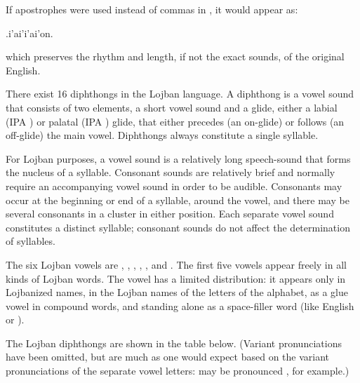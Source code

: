 If apostrophes were used instead of commas in , it would appear as:
\begin{example}
.i'ai'i'ai'on.\n
{}
\end{example}

{\noindent}which preserves the rhythm and length, if not the exact sounds, of the original English.



There exist 16 diphthongs in the Lojban language. A diphthong is a vowel sound that consists of two elements, a short vowel sound and a glide, either a labial (IPA ) or palatal (IPA ) glide, that either precedes (an on-glide) or follows (an off-glide) the main vowel. Diphthongs always constitute a single syllable.

For Lojban purposes, a vowel sound is a relatively long speech-sound that forms the nucleus of a syllable. Consonant sounds are relatively brief and normally require an accompanying vowel sound in order to be audible. Consonants may occur at the beginning or end of a syllable, around the vowel, and there may be several consonants in a cluster in either position. Each separate vowel sound constitutes a distinct syllable; consonant sounds do not affect the determination of syllables.

The six Lojban vowels are , , , , , and . The first five vowels appear freely in all kinds of Lojban words. The vowel  has a limited distribution: it appears only in Lojbanized names, in the Lojban names of the letters of the alphabet, as a glue vowel in compound words, and standing alone as a space-filler word (like English  or ).

The Lojban diphthongs are shown in the table below. (Variant pronunciations have been omitted, but are much as one would expect based on the variant pronunciations of the separate vowel letters:  may be pronounced , for example.)


